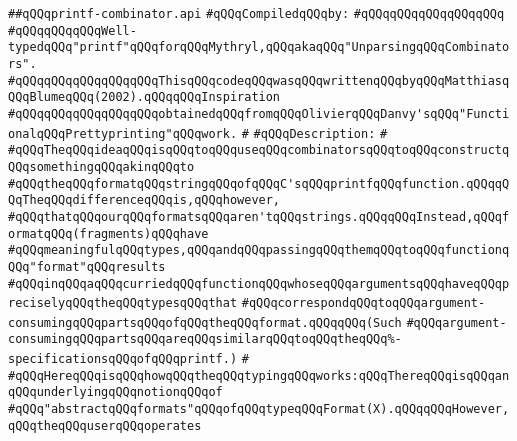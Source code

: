 \label{src/lib/src/printf-combinator.api}
\verb|##qQQqprintf-combinator.api|\newline
\newline
\verb|#qQQqCompiledqQQqby:|\newline
\verb|#qQQqqQQqqQQqqQQqqQQq|\newline
\newline
\newline
\newline
\newline
\verb|#qQQqqQQqqQQqWell-typedqQQq"printf"qQQqforqQQqMythryl,qQQqakaqQQq"UnparsingqQQqCombinators".|\newline
\verb|#qQQqqQQqqQQqqQQqqQQqThisqQQqcodeqQQqwasqQQqwrittenqQQqbyqQQqMatthiasqQQqBlumeqQQq(2002).qQQqqQQqInspiration|\newline
\verb|#qQQqqQQqqQQqqQQqqQQqobtainedqQQqfromqQQqOlivierqQQqDanvy'sqQQq"FunctionalqQQqPrettyprinting"qQQqwork.|\newline
\verb|#|\newline
\verb|#qQQqDescription:|\newline
\verb|#|\newline
\verb|#qQQqTheqQQqideaqQQqisqQQqtoqQQquseqQQqcombinatorsqQQqtoqQQqconstructqQQqsomethingqQQqakinqQQqto|\newline
\verb|#qQQqtheqQQqformatqQQqstringqQQqofqQQqC'sqQQqprintfqQQqfunction.qQQqqQQqTheqQQqdifferenceqQQqis,qQQqhowever,|\newline
\verb|#qQQqthatqQQqourqQQqformatsqQQqaren'tqQQqstrings.qQQqqQQqInstead,qQQqformatqQQq(fragments)qQQqhave|\newline
\verb|#qQQqmeaningfulqQQqtypes,qQQqandqQQqpassingqQQqthemqQQqtoqQQqfunctionqQQq"format"qQQqresults|\newline
\verb|#qQQqinqQQqaqQQqcurriedqQQqfunctionqQQqwhoseqQQqargumentsqQQqhaveqQQqpreciselyqQQqtheqQQqtypesqQQqthat|\newline
\verb|#qQQqcorrespondqQQqtoqQQqargument-consumingqQQqpartsqQQqofqQQqtheqQQqformat.qQQqqQQq(Such|\newline
\verb|#qQQqargument-consumingqQQqpartsqQQqareqQQqsimilarqQQqtoqQQqtheqQQq%-specificationsqQQqofqQQqprintf.)|\newline
\verb|#|\newline
\verb|#qQQqHereqQQqisqQQqhowqQQqtheqQQqtypingqQQqworks:qQQqThereqQQqisqQQqanqQQqunderlyingqQQqnotionqQQqof|\newline
\verb|#qQQq"abstractqQQqformats"qQQqofqQQqtypeqQQqFormat(X).qQQqqQQqHowever,qQQqtheqQQquserqQQqoperates|\newline
